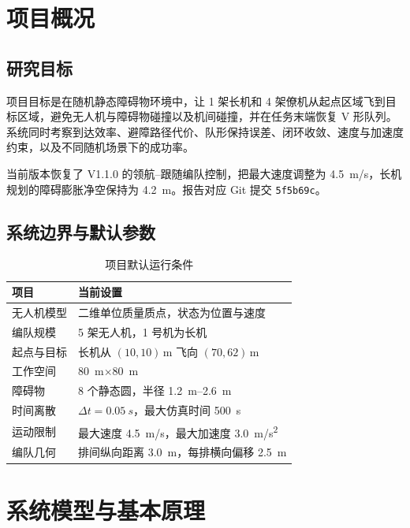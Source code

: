 \documentclass[UTF8,a4paper,12pt,fontset=windows]{ctexart}
\newcommand{\code}[1]{\texttt{#1}}
\begin{document}
\clearpage
\begingroup
\small
{}
\tableofcontents
\endgroup
\clearpage
{}

\section{项目概况}

\subsection{研究目标}

项目目标是在随机静态障碍物环境中，让 1 架长机和 4 架僚机从起点区域飞到目标区域，避免无人机与障碍物碰撞以及机间碰撞，并在任务末端恢复 V 形队列。系统同时考察到达效率、避障路径代价、队形保持误差、闭环收敛、速度与加速度约束，以及不同随机场景下的成功率。

当前版本恢复了 V1.1.0 的领航--跟随编队控制，把最大速度调整为 \SI{4.5}{m/s}，长机规划的障碍膨胀净空保持为 \SI{4.2}{m}。报告对应 Git 提交 \code{5f5b69c}。

\subsection{系统边界与默认参数}

\begin{table}[H]
\centering
\caption{项目默认运行条件}
\label{tab:scope}
\begin{tabularx}{0.93\textwidth}{@{}lY@{}}
\toprule
项目 & 当前设置 \\
\midrule
无人机模型 & 二维单位质量质点，状态为位置与速度 \\
编队规模 & 5 架无人机，1 号机为长机 \\
起点与目标 & 长机从 $(10,10)\,\mathrm{m}$ 飞向 $(70,62)\,\mathrm{m}$ \\
工作空间 & \SI{80}{m}$\times$\SI{80}{m} \\
障碍物 & 8 个静态圆，半径 \SIrange{1.2}{2.6}{m} \\
时间离散 & $\Delta t=\SI{0.05}{s}$，最大仿真时间 \SI{500}{s} \\
运动限制 & 最大速度 \SI{4.5}{m/s}，最大加速度 \SI{3.0}{m/s^2} \\
编队几何 & 排间纵向距离 \SI{3.0}{m}，每排横向偏移 \SI{2.5}{m} \\
\bottomrule
\end{tabularx}
\end{table}

\section{系统模型与基本原理}
\end{document}
